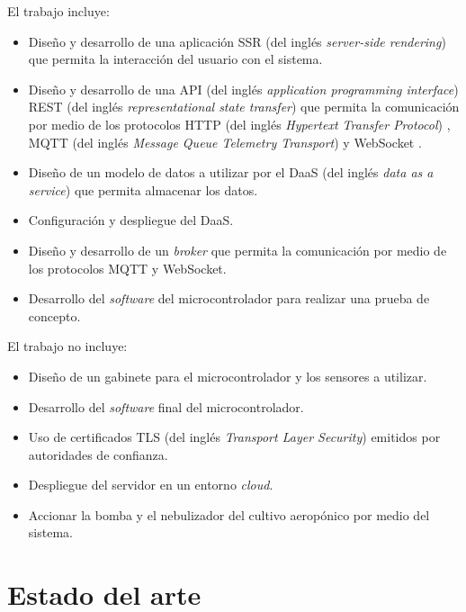 El trabajo incluye:
\begin{itemize}
	\item Diseño y desarrollo de una aplicación SSR (del inglés \textit{server-side rendering}) \citep{WEBSITE:SSR} que permita la interacción del usuario con el sistema.
	\item Diseño y desarrollo de una API (del inglés \textit{application programming interface}) \citep{WEBSITE:API} REST (del inglés \textit{representational state transfer}) \citep{WEBSITE:REST} que permita la comunicación por medio de los protocolos HTTP (del inglés \textit{Hypertext Transfer Protocol}) \citep{WEBSITE:HTTP}, MQTT (del inglés \textit{Message Queue Telemetry Transport}) \citep{WEBSITE:MQTT} y WebSocket \citep{WEBSITE:WEBSOCKET}.
	\item Diseño de un modelo de datos a utilizar por el DaaS (del inglés \textit{data as a service}) \citep{WEBSITE:DAAS} que permita almacenar los datos.
	\item Configuración y despliegue del DaaS.
	\item Diseño y desarrollo de un \textit{broker} que permita la comunicación por medio de los protocolos MQTT y WebSocket.
	\item Desarrollo del \emph{software} del microcontrolador para realizar una prueba de concepto.
\end{itemize}

El trabajo no incluye:
\begin{itemize}
	\item Diseño de un gabinete para el microcontrolador y los sensores a utilizar.
	\item Desarrollo del \emph{software} final del microcontrolador.
	\item Uso de certificados TLS (del inglés \textit{Transport Layer Security}) \citep{WEBSITE:TLS} emitidos por autoridades de confianza.
	\item Despliegue del servidor en un entorno \textit{cloud}.
	\item Accionar la bomba y el nebulizador del cultivo aeropónico por medio del sistema.
\end{itemize}


\section{Estado del arte}

